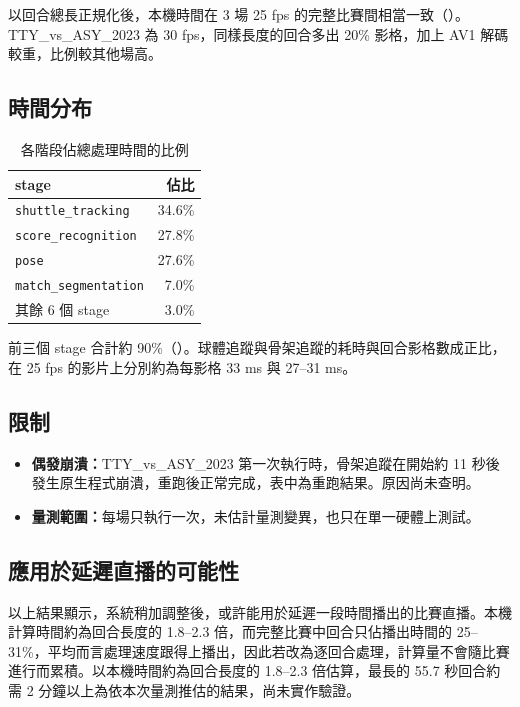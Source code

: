 以回合總長正規化後，本機時間在 3 場 25 fps 的完整比賽間相當一致（）。TTY\_vs\_ASY\_2023 為 30 fps，同樣長度的回合多出 20\% 影格，加上 AV1 解碼較重，比例較其他場高。

\subsection{時間分布}

\begin{table}[htbp]
  \centering
  \small
  \caption{各階段佔總處理時間的比例}
  \label{tab:e2e-breakdown}
  \begin{tabular}{|l|r|}
    \hline
    stage & 佔比 \\ \hline
    \texttt{shuttle\_tracking} & 34.6\% \\ \hline
    \texttt{score\_recognition} & 27.8\% \\ \hline
    \texttt{pose} & 27.6\% \\ \hline
    \texttt{match\_segmentation} & 7.0\% \\ \hline
    其餘 6 個 stage & 3.0\% \\ \hline
  \end{tabular}
\end{table}

前三個 stage 合計約 90\%（）。球體追蹤與骨架追蹤的耗時與回合影格數成正比，在 25 fps 的影片上分別約為每影格 33 ms 與 27--31 ms。

\subsection{限制}

\begin{itemize}
  \item \textbf{偶發崩潰：}TTY\_vs\_ASY\_2023 第一次執行時，骨架追蹤在開始約 11 秒後發生原生程式崩潰，重跑後正常完成，表中為重跑結果。原因尚未查明。
  \item \textbf{量測範圍：}每場只執行一次，未估計量測變異，也只在單一硬體上測試。
\end{itemize}

\subsection{應用於延遲直播的可能性}

以上結果顯示，系統稍加調整後，或許能用於延遲一段時間播出的比賽直播。本機計算時間約為回合長度的 1.8--2.3 倍，而完整比賽中回合只佔播出時間的 25--31\%，平均而言處理速度跟得上播出，因此若改為逐回合處理，計算量不會隨比賽進行而累積。以本機時間約為回合長度的 1.8--2.3 倍估算，最長的 55.7 秒回合約需 2 分鐘以上為依本次量測推估的結果，尚未實作驗證。
